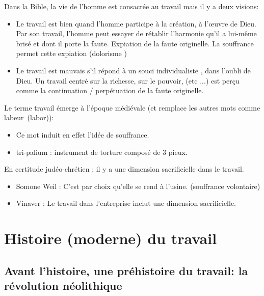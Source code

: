 \documentclass[a4paper, 11pt, hidelinks]{article}
\begin{document}



Dans la Bible, la vie de l'homme est consacrée au travail mais il y a deux visions: 

\begin{itemize}
    \item Le travail est bien quand l'homme participe à la création, à l'\oe uvre de Dieu. Par son travail, l'homme peut essayer de
    rétablir l'harmonie qu'il a lui-même brisé et dont il porte la faute. Expiation de la faute originelle. La souffrance permet cette
    expiation (\og dolorisme \fg)
    \item Le travail est mauvais s'il répond à un souci \og individualiste \fg, dans l'oubli de Dieu. Un travail centré sur la richesse, sur
    le pouvoir, (etc ...) est perçu comme la continuation / perpétuation de la \og faute \fg originelle. 
\end{itemize}


Le terme \og travail \fg émerge à l'époque médiévale (et remplace les autres mots comme \og labeur \fg (labor)):
\begin{itemize}
    \item Ce mot induit en effet l'idée de souffrance.
    \item \og tri-palium \fg : instrument de torture composé de $3$ pieux.
\end{itemize}


En certitude judéo-chrétien : il y a une dimension sacrificielle dans le travail.


\begin{itemize}
    \item Somone Weil : C'est par choix qu'elle se rend à l'usine. (souffrance volontaire)
    \item Vinaver : Le travail dans l'entreprise inclut une dimension sacrificielle.
\end{itemize}





\section{Histoire (moderne) du travail}

\subsection{Avant l'histoire, une \og préhistoire \fg du travail: la révolution néolithique}
\end{document}
